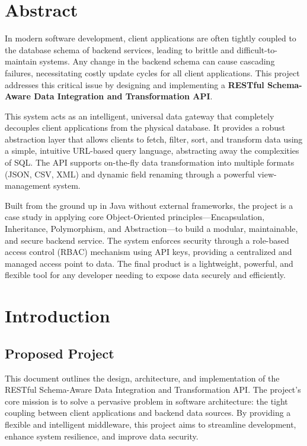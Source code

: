 \documentclass[12pt, a4paper]{report}
\begin{document}
\chapter*{Abstract}
In modern software development, client applications are often tightly coupled to the database schema of backend services, leading to brittle and difficult-to-maintain systems. Any change in the backend schema can cause cascading failures, necessitating costly update cycles for all client applications. This project addresses this critical issue by designing and implementing a \textbf{RESTful Schema-Aware Data Integration and Transformation API}.

This system acts as an intelligent, universal data gateway that completely decouples client applications from the physical database. It provides a robust abstraction layer that allows clients to fetch, filter, sort, and transform data using a simple, intuitive URL-based query language, abstracting away the complexities of SQL. The API supports on-the-fly data transformation into multiple formats (JSON, CSV, XML) and dynamic field renaming through a powerful view-management system.

Built from the ground up in Java without external frameworks, the project is a case study in applying core Object-Oriented principles—Encapsulation, Inheritance, Polymorphism, and Abstraction—to build a modular, maintainable, and secure backend service. The system enforces security through a role-based access control (RBAC) mechanism using API keys, providing a centralized and managed access point to data. The final product is a lightweight, powerful, and flexible tool for any developer needing to expose data securely and efficiently.

\newpage
\tableofcontents
\newpage

\chapter{Introduction}
\section{Proposed Project}
This document outlines the design, architecture, and implementation of the RESTful Schema-Aware Data Integration and Transformation API. The project's core mission is to solve a pervasive problem in software architecture: the tight coupling between client applications and backend data sources. By providing a flexible and intelligent middleware, this project aims to streamline development, enhance system resilience, and improve data security.
\end{document}
